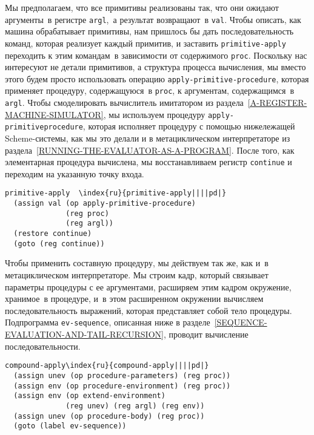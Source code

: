 Мы предполагаем, что все примитивы реализованы так, что
они ожидают аргументы~в регистре {\tt argl},~а результат
возвращают~в {\tt val}.  Чтобы описать, как машина обрабатывает
примитивы, нам пришлось бы дать последовательность команд, которая
реализует каждый примитив, и заставить {\tt primitive-apply}
переходить к этим командам~в зависимости от содержимого
{\tt proc}.  Поскольку нас интересуют не детали примитивов, а
структура процесса вычисления, мы вместо этого будем просто
использовать операцию {\tt apply-primitive-procedure}, которая
применяет процедуру, содержащуюся~в {\tt proc}, к аргументам,
содержащимся~в {\tt argl}.  Чтобы смоделировать
вычислитель имитатором из 
раздела~\ref{A-REGISTER-MACHINE-SIMULATOR}, мы используем
процедуру {\tt apply-primitive\-procedure}, которая исполняет
процедуру с помощью нижележащей Scheme-системы, как мы это делали и в
метациклическом интерпретаторе из
раздела~\ref{RUNNING-THE-EVALUATOR-AS-A-PROGRAM}.  После того, как
элементарная процедура вычислена, мы восстанавливаем  регистр
{\tt continue} и переходим на указанную точку входа.

\begin{Verbatim}[fontsize=\small]
primitive-apply  \index{ru}{primitive-apply||||pd|}
  (assign val (op apply-primitive-procedure)
              (reg proc)
              (reg argl))
  (restore continue)
  (goto (reg continue))
\end{Verbatim}

Чтобы применить  составную
процедуру, мы действуем так же, 
как и~в метациклическом интерпретаторе.   Мы строим кадр, который
связывает параметры процедуры с ее аргументами, расширяем этим кадром
окружение, хранимое~в процедуре, и~в этом расширенном окружении
вычисляем последовательность выражений, которая представляет собой
тело процедуры.  Подпрограмма {\tt ev-sequence}, описанная ниже
в разделе~\ref{SEQUENCE-EVALUATION-AND-TAIL-RECURSION},
проводит вычисление последовательности.

\begin{Verbatim}[fontsize=\small]
compound-apply\index{ru}{compound-apply||||pd|}
  (assign unev (op procedure-parameters) (reg proc))
  (assign env (op procedure-environment) (reg proc))
  (assign env (op extend-environment)
              (reg unev) (reg argl) (reg env))
  (assign unev (op procedure-body) (reg proc))
  (goto (label ev-sequence))
\end{Verbatim}


